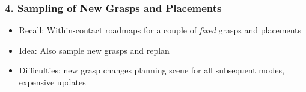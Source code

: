 \documentclass[12pt, %
			  t     %
]{beamer}%
\begin{document}
\begin{frame}


\end{frame}

\begin{frame}
\frametitle{4. Sampling of New Grasps and Placements}
\begin{itemize}
  \item Recall: Within-contact roadmaps for a couple of \textit{fixed} grasps and placements
  \item Idea: Also sample new grasps and replan
  \item Difficulties: new grasp changes planning scene for all subsequent modes, expensive updates
\end{itemize}


\end{frame}

\end{document}
